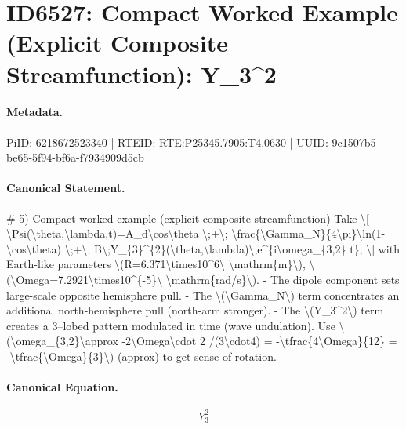 \section*{ID6527: Compact Worked Example (Explicit Composite Streamfunction): Y\_3\textasciicircum{}2}
\paragraph{Metadata.}
PiID: 6218672523340 | RTEID: RTE:P25345.7905:T4.0630 | UUID: 9c1507b5-be65-5f94-bf6a-f7934909d5cb

\paragraph{Canonical Statement.}
\# 5) Compact worked example (explicit composite streamfunction) Take \textbackslash{}[ \textbackslash{}Psi(\textbackslash{}theta,\textbackslash{}lambda,t)=A\_d\textbackslash{}cos\textbackslash{}theta \textbackslash{};+\textbackslash{}; \textbackslash{}frac\{\textbackslash{}Gamma\_N\}\{4\textbackslash{}pi\}\textbackslash{}ln(1-\textbackslash{}cos\textbackslash{}theta) \textbackslash{};+\textbackslash{}; B\textbackslash{};Y\_\{3\}\textasciicircum{}\{2\}(\textbackslash{}theta,\textbackslash{}lambda)\textbackslash{},e\textasciicircum{}\{i\textbackslash{}omega\_\{3,2\} t\}, \textbackslash{}] with Earth-like parameters \textbackslash{}(R=6.371\textbackslash{}times10\textasciicircum{}6\textbackslash{} \textbackslash{}mathrm\{m\}\textbackslash{}), \textbackslash{}(\textbackslash{}Omega=7.2921\textbackslash{}times10\textasciicircum{}\{-5\}\textbackslash{} \textbackslash{}mathrm\{rad/s\}\textbackslash{}). - The dipole component sets large-scale opposite hemisphere pull. - The \textbackslash{}(\textbackslash{}Gamma\_N\textbackslash{}) term concentrates an additional north-hemisphere pull (north-arm stronger). - The \textbackslash{}(Y\_3\textasciicircum{}2\textbackslash{}) term creates a 3–lobed pattern modulated in time (wave undulation). Use \textbackslash{}(\textbackslash{}omega\_\{3,2\}\textbackslash{}approx -2\textbackslash{}Omega\textbackslash{}cdot 2 /(3\textbackslash{}cdot4) = -\textbackslash{}tfrac\{4\textbackslash{}Omega\}\{12\} = -\textbackslash{}tfrac\{\textbackslash{}Omega\}\{3\}\textbackslash{}) (approx) to get sense of rotation.

\paragraph{Canonical Equation.}
\[
Y_3^2
\]

